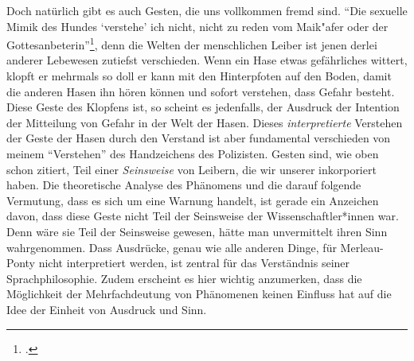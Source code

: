 \documentclass[a4paper, 12pt]{article}
\begin{document}
\begin{onehalfspace}
Doch natürlich gibt es auch Gesten, die uns vollkommen fremd sind. "`Die sexuelle Mimik des Hundes `verstehe' ich nicht, nicht zu reden vom Maik"afer oder der Gottesanbeterin"'\footnote{\Cite[Siehe][S. 219]{merleau1966phanomenologie}.}, denn die Welten der menschlichen Leiber ist jenen derlei anderer Lebewesen zutiefst verschieden. Wenn ein Hase etwas gefährliches wittert, klopft er mehrmals so doll er kann mit den Hinterpfoten auf den Boden, damit die anderen Hasen ihn hören können und sofort verstehen, dass Gefahr besteht. Diese Geste des Klopfens ist, so scheint es jedenfalls, der Ausdruck der Intention der Mitteilung von Gefahr in der Welt der Hasen. Dieses \emph{interpretierte} Verstehen der Geste der Hasen durch den Verstand ist aber fundamental verschieden von meinem "`Verstehen"' des Handzeichens des Polizisten. Gesten sind, wie oben schon zitiert, Teil einer \emph{Seinsweise} von Leibern, die wir unserer inkorporiert haben. Die theoretische Analyse des Phänomens und die darauf folgende Vermutung, dass es sich um eine Warnung handelt, ist gerade ein Anzeichen davon, dass diese Geste nicht Teil der Seinsweise der Wissenschaftler*innen war. Denn wäre sie Teil der Seinsweise gewesen, hätte man unvermittelt ihren Sinn wahrgenommen. Dass Ausdrücke, genau wie alle anderen Dinge, für Merleau-Ponty nicht interpretiert werden, ist zentral für das Verständnis seiner Sprachphilosophie. Zudem erscheint es hier wichtig anzumerken, dass die Möglichkeit der Mehrfachdeutung von Phänomenen keinen Einfluss hat auf die Idee der Einheit von Ausdruck und Sinn.


\end{onehalfspace}
\end{document}
